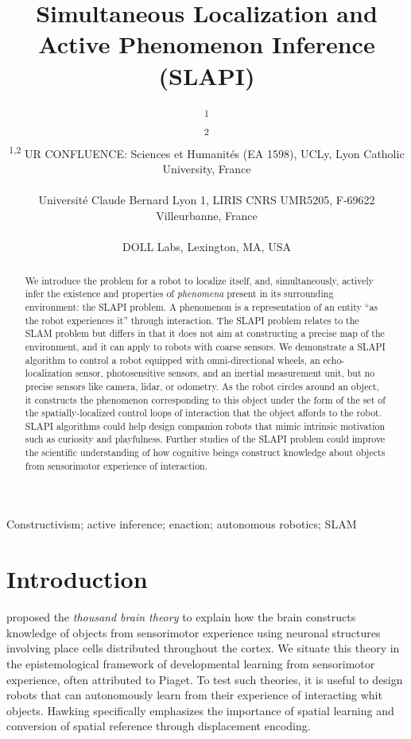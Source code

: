 \documentclass[pmlr]{jmlr}%
\title[SLAPI]{Simultaneous Localization and Active Phenomenon Inference (SLAPI)}
\author{\Name{Olivier L. Georgeon}\textsuperscript{1} \Email{ogeorgeon@univ-catholyon.fr}\\
  \Name{Juan R. Vidal}\textsuperscript{2} \Email{jvidal@univ-catholyon.fr}\\
  \addr \textsuperscript{1,2} UR CONFLUENCE: Sciences et Humanités (EA 1598), UCLy, Lyon Catholic University, France\\
  \Name{Titouan Knockaert} \Email{titouan.knockaert@gmail.com}\\
  \addr Université Claude Bernard Lyon 1, LIRIS CNRS UMR5205, F-69622 Villeurbanne, France\\
  \Name{Paul Robertson} \Email{paulr@dollabs.com}\\
  \addr DOLL Labs, Lexington, MA, USA\\
}
\begin{document}
\maketitle

\begin{abstract}
We introduce the problem for a robot to  localize itself, and, simultaneously, actively infer the existence and properties of \textit{phenomena} present in its surrounding environment: the SLAPI problem. 
A phenomenon is a representation of an entity ``as the robot experiences it'' through interaction. 
The SLAPI problem relates to the SLAM problem but differs in that it does not aim at constructing a precise map of the environment, and it can apply to robots with coarse sensors. 
We demonstrate a SLAPI algorithm to control a robot equipped with omni-directional wheels, an echo-localization sensor, photosensitive sensors, and an inertial measurement unit, but no precise sensors like camera, lidar, or odometry. 
As the robot circles around an object, it constructs the phenomenon corresponding to this object under the form of the set of the spatially-localized control loops of interaction that the object affords to the robot. 
SLAPI algorithms could help design companion robots that mimic intrinsic motivation such as curiosity and playfulness. 
Further studies of the SLAPI problem could improve the scientific understanding of how cognitive beings construct knowledge about objects from sensorimotor experience of interaction.
\end{abstract}

\begin{keywords}
Constructivism; active inference; enaction; autonomous robotics; SLAM
\end{keywords}

\section{Introduction}
\label{sec:intro}

\cite{hawkins_framework_2019} proposed the \textit{thousand brain theory} to explain how the brain constructs knowledge of objects from sensorimotor experience using neuronal structures involving place cells distributed throughout the cortex.
We situate this theory in the epistemological framework of developmental learning from sensorimotor experience, often attributed to Piaget.
To test such theories, it is useful to design robots that can autonomously learn from their experience of interacting whit objects.
Hawking specifically emphasizes the importance of spatial learning and conversion of spatial reference through displacement encoding. 
\end{document}
